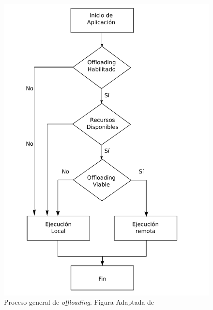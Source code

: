  \begin{figure}[h]
   \centering
 \includegraphics[scale=0.37]{Figures/processoffloadingcomputing}
 \caption{Proceso general de \emph{offloading}. Figura Adaptada de \cite{6553297} }
 \label{fig:offloadingAlgorithm}
 \end{figure}
 
 
